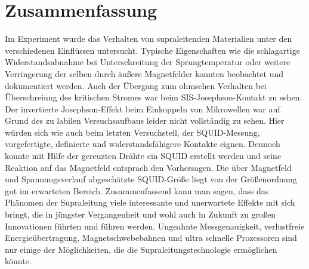 \section{Zusammenfassung} %
\label{sec:zusammenfassung}


	Im Experiment wurde das Verhalten von supraleitenden Materialien unter den verschiedenen Einflüssen untersucht. 
	Typische Eigenschaften wie die schlagartige Widerstandsabnahme bei Unterschreitung der  Sprungtemperatur oder weitere Verringerung der selben durch äußere Magnetfelder konnten beobachtet und dokumentiert werden. 
	Auch der Übergang zum ohmschen Verhalten bei Überschreiung des kritischen Stromes war beim SIS-Josephson-Kontakt zu sehen. 
	Der 
	invertierte Josephson-Effekt beim Einkoppeln von Mikrowellen war auf Grund des zu labilen Versuchsaufbaus 
	leider nicht vollständig zu sehen. 
	Hier würden sich wie auch beim letzten Versuchsteil, der SQUID-Messung, vorgefertigte, definierte und widerstandsfähigere Kontakte eignen. 
	Dennoch konnte mit Hilfe der gereuzten Drähte ein SQUID erstellt werden und seine Reaktion auf das Magnetfeld entsprach den Vorhersagen. 
	Die über Magnetfeld und Spannungsverlauf abgeschätzte SQUID-Größe liegt von der Größenordnung gut im erwarteten Bereich.
	Zusammenfassend kann man sagen, dass das Phänomen der Supraleitung viele interessante und unerwartete Effekte mit sich bringt, die in jüngster Vergangenheit und wohl auch in Zukunft zu großen Innovationen führten und führen werden. Ungeahnte Messgenauigkeit, verlustfreie Energieübertragung, Magnetschwebebahnen und ultra schnelle Prozessoren sind nur einige der
	Möglichkeiten, die die Supraleitungstechnologie ermöglichen könnte.



